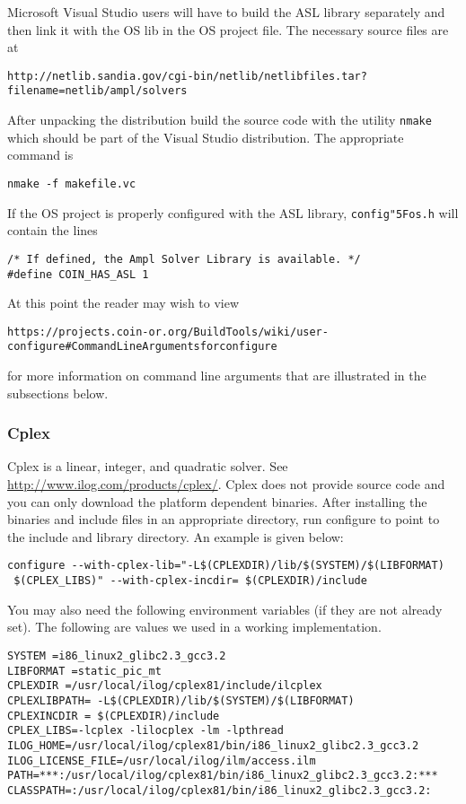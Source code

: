 \documentclass[11pt]{article}
\renewcommand{\_}{{\char"5F}}
\renewcommand{\{}{{\char"7B}}
\renewcommand{\}}{{\char"7D}}
\renewcommand{\^}{{\char"0D}}
\renewcommand{\'}{{\char"0D}}
\begin{document}
Microsoft  Visual Studio users will have to build the ASL library separately and then link it with the OS lib in the OS project file.  The necessary source files are at
\begin{verbatim}
http://netlib.sandia.gov/cgi-bin/netlib/netlibfiles.tar?filename=netlib/ampl/solvers
\end{verbatim}
 After unpacking the distribution build the source code with the utility {\tt nmake} which should be part of the Visual Studio distribution. The appropriate command is
\begin{verbatim}
nmake -f makefile.vc
\end{verbatim}
If the OS project is properly configured  with the ASL library, {\tt config\_os.h} will contain the lines
\begin{verbatim}
/* If defined, the Ampl Solver Library is available. */
#define COIN_HAS_ASL 1
\end{verbatim}

At this point the reader may wish to view
\begin{verbatim}
https://projects.coin-or.org/BuildTools/wiki/user-configure#CommandLineArgumentsforconfigure
\end{verbatim}
for more information on command line arguments that are illustrated in the subsections below.


\subsubsection{Cplex}

Cplex is a linear, integer, and quadratic solver. See \url{http://www.ilog.com/products/cplex/}.  Cplex does not provide source code and you can only download the platform dependent binaries. After installing the binaries and include files in an appropriate directory, run configure to point to the include and library directory. An example is given below:

\begin{verbatim}
configure --with-cplex-lib="-L$(CPLEXDIR)/lib/$(SYSTEM)/$(LIBFORMAT)
 $(CPLEX_LIBS)" --with-cplex-incdir= $(CPLEXDIR)/include
\end{verbatim}

You may also need the following environment variables (if they are not already set). The following are values we used in a working implementation.
\begin{verbatim}
SYSTEM =i86_linux2_glibc2.3_gcc3.2
LIBFORMAT =static_pic_mt
CPLEXDIR =/usr/local/ilog/cplex81/include/ilcplex
CPLEXLIBPATH= -L$(CPLEXDIR)/lib/$(SYSTEM)/$(LIBFORMAT)
CPLEXINCDIR = $(CPLEXDIR)/include
CPLEX_LIBS=-lcplex -lilocplex -lm -lpthread
ILOG_HOME=/usr/local/ilog/cplex81/bin/i86_linux2_glibc2.3_gcc3.2
ILOG_LICENSE_FILE=/usr/local/ilog/ilm/access.ilm
PATH=***:/usr/local/ilog/cplex81/bin/i86_linux2_glibc2.3_gcc3.2:***
CLASSPATH=:/usr/local/ilog/cplex81/bin/i86_linux2_glibc2.3_gcc3.2:
\end{verbatim}
\end{document}

